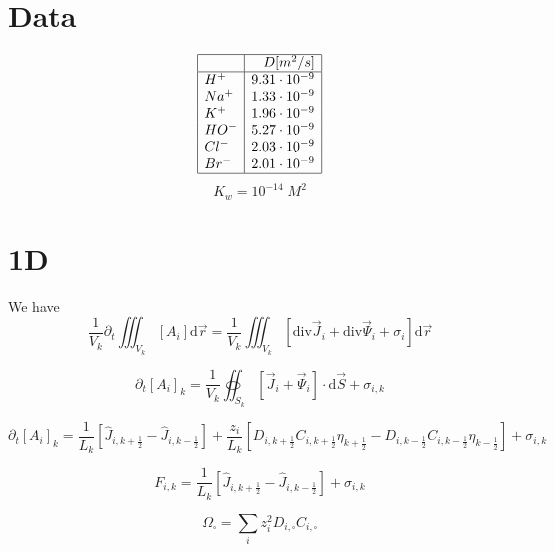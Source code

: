 \documentclass[aps,12pt]{revtex4}
\newcommand{\half}{\frac{1}{2}}
\begin{document}
\section{Data}

\begin{equation}
\begin{array}{|l|r|}
\hline
 \text{} & D[m^2/s]  \\
 \hline
 	H^+	 & 9.31\cdot10^{-9}	\\
 	Na^+ & 1.33\cdot10^{-9}	 \\
 	K^+	 & 1.96\cdot10^{-9}	 \\
 	HO^- & 5.27\cdot10^{-9}	 \\
 	Cl^- & 2.03\cdot10^{-9} \\
 	Br^- & 2.01\cdot10^{-9} \\
\hline
\end{array}
\end{equation}
$$
	K_w = 10^{-14}\; M^2
$$

\section{1D}

We have 
\begin{equation}
	\dfrac{1}{V_k} \partial_t \iiint_{V_k} [A_i] \mathrm d\vec r = \dfrac{1}{V_k} \iiint_{V_k} \left[ \mathrm{div} \vec J_i + \mathrm{div} \vec \Psi _i + \sigma_i \right] \mathrm d \vec r
\end{equation}

\begin{equation}
	\partial_t [A_i]_k = \dfrac{1}{V_k}\oiint_{S_k}  \left[ \vec J_i + \vec \Psi_i \right] \cdot \mathrm d \vec S + \sigma_{i,k}
\end{equation}


\begin{equation}
	\partial_t  [A_i]_k = \dfrac{1}{L_k} \left[ \hat J_{i,k+\half} - \hat J_{i,k-\half} \right] 
	+ \dfrac{z_i}{L_k}\left[ D_{i,k+\half} C_{i,k+\half} \eta_{k+\half} -  D_{i,k-\half} C_{i,k-\half} \eta_{k-\half}\right]+ \sigma_{i,k}
\end{equation}

\begin{equation}
	F_{i,k} =  \dfrac{1}{L_k} \left[ \hat J_{i,k+\half} - \hat J_{i,k-\half} \right]  + \sigma_{i,k}
\end{equation}

\begin{equation}
	\Omega_{\square} = \sum_i z_i^2 D_{i,\square} C_{i,\square}
\end{equation}
\end{document}
